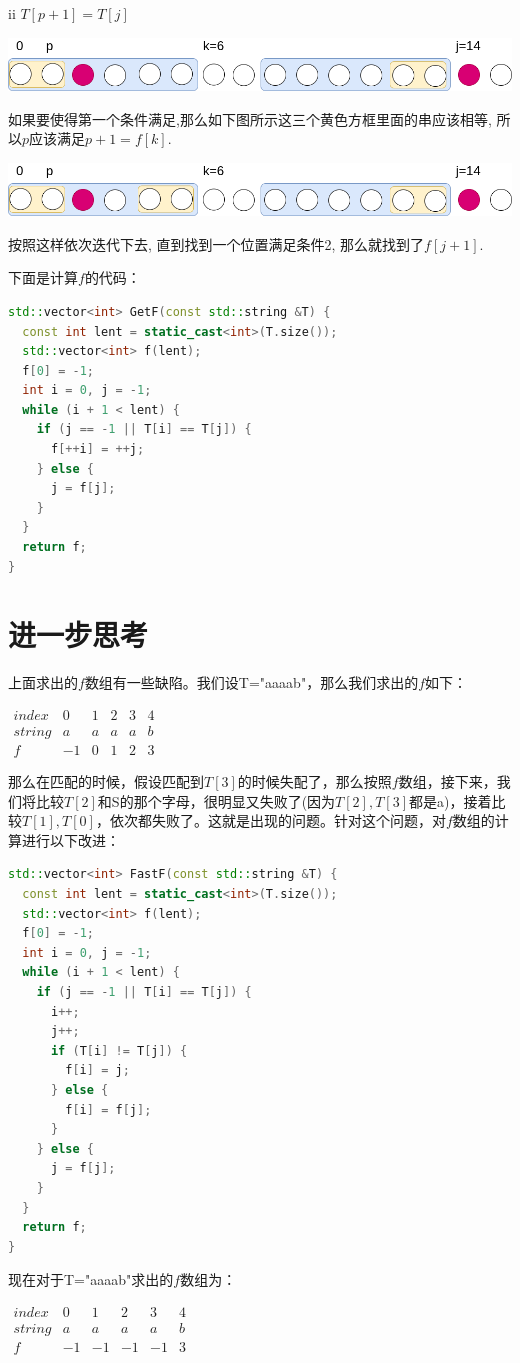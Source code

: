 \documentclass{article}
\begin{document}
ii $T[p+1]=T[j]$ \par
\includegraphics[scale=0.35]{pic5.png} \par
如果要使得第一个条件满足,那么如下图所示这三个黄色方框里面的串应该相等, 所以$p$应该满足$p+1=f[k]$. \par
\includegraphics[scale=0.35]{pic6.png} \par
按照这样依次迭代下去, 直到找到一个位置满足条件2, 那么就找到了$f[j+1]$. \par
下面是计算$f$的代码： \par
\begin{lstlisting}[language=C++, caption={Compute $f$}]
std::vector<int> GetF(const std::string &T) {
  const int lent = static_cast<int>(T.size());
  std::vector<int> f(lent);
  f[0] = -1;
  int i = 0, j = -1;
  while (i + 1 < lent) {
    if (j == -1 || T[i] == T[j]) {
      f[++i] = ++j;
    } else {
      j = f[j];
    }
  }
  return f;
}
\end{lstlisting}

\section{进一步思考}
上面求出的$f$数组有一些缺陷。我们设T="aaaab"，那么我们求出的$f$如下： \par

$\begin{matrix}
index & 0 & 1 & 2 & 3 & 4 \\ 
string & a & a & a & a & b \\ 
f & -1 & 0 & 1 & 2 & 3 
\end{matrix}$

那么在匹配的时候，假设匹配到$T[3]$的时候失配了，那么按照$f$数组，接下来，我们将比较$T[2]$和S的那个字母，很明显又失败了(因为$T[2],T[3]$都是a)，接着比较$T[1],T[0]$，依次都失败了。这就是出现的问题。针对这个问题，对$f$数组的计算进行以下改进： \par
\begin{lstlisting}[language=C++, caption={Batter algorithm to compute $f$}]
std::vector<int> FastF(const std::string &T) {
  const int lent = static_cast<int>(T.size());
  std::vector<int> f(lent);
  f[0] = -1;
  int i = 0, j = -1;
  while (i + 1 < lent) {
    if (j == -1 || T[i] == T[j]) {
      i++;
      j++;
      if (T[i] != T[j]) {
        f[i] = j;
      } else {
        f[i] = f[j];
      }
    } else {
      j = f[j];
    }
  }
  return f;
}
\end{lstlisting}
现在对于T="aaaab"求出的$f$数组为： \par

$\begin{matrix}
index & 0 & 1 & 2 & 3 & 4 \\ 
string & a & a & a & a & b \\ 
f & -1 & -1 & -1 & -1 & 3 
\end{matrix}$
\end{document}
